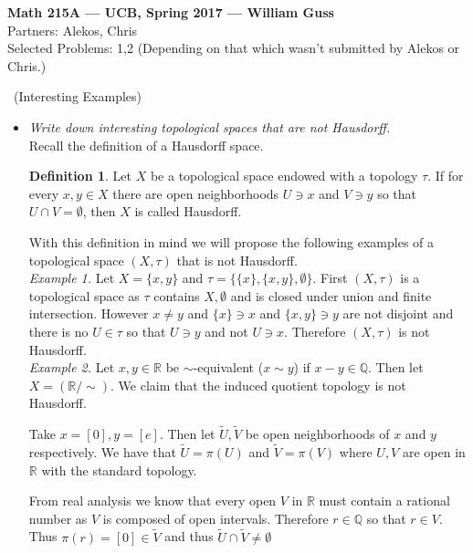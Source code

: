 \documentclass[11pt]{amsart}
\theoremstyle{definition}
\newtheorem{definition}{Definition}
\numberwithin{theorem}{section}
\numberwithin{definition}{section}
\numberwithin{equation}{section}
\begin{document}
\begin{center}{\bf Math 215A --- UCB, Spring 2017 --- William Guss} \\
Partners: Alekos, Chris \\
Selected Problems: 1,2 (Depending on that which wasn't submitted by Alekos or Chris.)
\end{center}


\medskip {}\ (Interesting Examples)\:
\begin{itemize}
 	\item \emph{Write down interesting topological spaces that are not Hausdorff.} \\

 	\noindent Recall the definition of a Hausdorff space.
 	\begin{definition}
 		Let $X$ be a topological space endowed with a topology $\tau$. If for every $x,y \in X$ there are open neighborhoods $U \ni x$ and $V \ni y$ so that $U \cap V = \emptyset$, then $X$ is called Hausdorff. 	
 	\end{definition}
 	\noindent With this definition in mind we will propose the following examples of a topological space $(X, \tau)$ that is not Hausdorff. \\


 	\noindent \emph{Example 1.} Let $X = \{x,y\}$ and $\tau = \{\{x\}, \{x,y\}, \emptyset\}.$ First $(X, \tau)$ is a topological space as $\tau$ contains $X, \emptyset$ and is closed under union and finite intersection. However $x \neq y$ and $\{x\} \ni x$ and $\{x,y\} \ni y$ are not disjoint and there is no $U \in \tau$ so that $U \ni y$ and not $U \ni x$. Therefore $(X, \tau)$ is not Hausdorff. \\

 	\noindent \emph{Example 2. } Let $x,y \in \mathbb{R}$ be $\sim$-equivalent ($x \sim y$) if $x -y \in \mathbb{Q}.$ Then let $X = (\mathbb{R}/\sim).$ We claim that the induced quotient topology is not Hausdorff.

 	Take $x = [0], y = [e]$.  Then let $\tilde U, \tilde V$ be open neighborhoods of $x$ and $y$ respectively. We have that $\tilde U = \pi(U)$ and $\tilde V = \pi(V)$ where $U,V$ are open in $\mathbb{R}$ with the standard topology. 

 	From real analysis we know that every open $V$ in $\mathbb{R}$ must contain a rational number as $V$ is composed of open intervals. Therefore $r \in \mathbb{Q}$ so that $r \in V$. Thus $\pi(r) = [0] \in \tilde V$ and thus $\tilde U \cap \tilde V \neq \emptyset$ 


\end{itemize}
\end{document}
